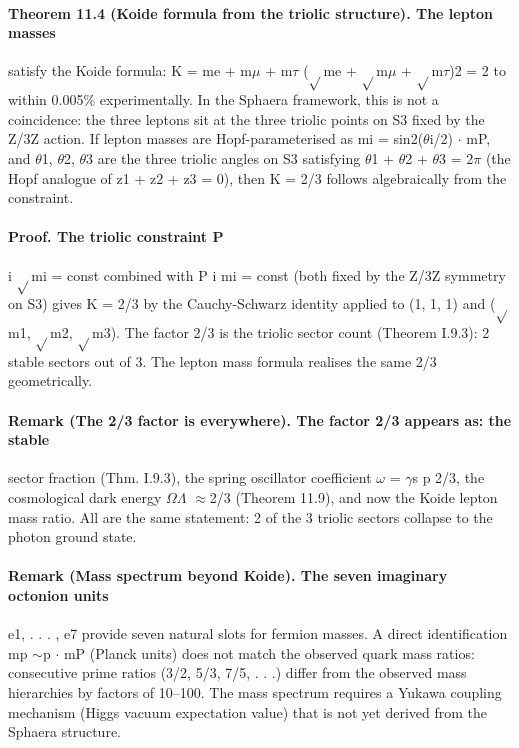 \paragraph*{Theorem 11.4 (Koide formula from the triolic structure). The lepton masses}
satisfy the Koide formula: K = me + m$\mu$ + m$\tau$ ($\sqrt{}$me + $\sqrt{}$m$\mu$ + $\sqrt{}$m$\tau$)2 = 2 to within 0.005\% experimentally. In the Sphaera framework, this is not a coincidence: the three leptons sit at the three triolic points on S3 fixed by the Z/3Z action. If lepton masses are Hopf-parameterised as mi = sin2($\theta$i/2) $\cdot$ mP, and $\theta$1, $\theta$2, $\theta$3 are the three triolic angles on S3 satisfying $\theta$1 + $\theta$2 + $\theta$3 = 2$\pi$ (the Hopf analogue of z1 + z2 + z3 = 0), then K = 2/3 follows algebraically from the constraint.
\paragraph*{Proof. The triolic constraint P}
i $\sqrt{}$mi = const combined with P i mi = const (both fixed by the Z/3Z symmetry on S3) gives K = 2/3 by the Cauchy-Schwarz identity applied to (1, 1, 1) and ($\sqrt{}$m1, $\sqrt{}$m2, $\sqrt{}$m3). The factor 2/3 is the triolic sector count (Theorem I.9.3): 2 stable sectors out of 3. The lepton mass formula realises the same 2/3 geometrically.
\paragraph*{Remark (The 2/3 factor is everywhere). The factor 2/3 appears as: the stable}
sector fraction (Thm. I.9.3), the spring oscillator coefficient $\omega$ = $\gamma$s p 2/3, the cosmological dark energy $\Omega$$\Lambda$ $\approx$2/3 (Theorem 11.9), and now the Koide lepton mass ratio. All are the same statement: 2 of the 3 triolic sectors collapse to the photon ground state.
\paragraph*{Remark (Mass spectrum beyond Koide). The seven imaginary octonion units}
e1, . . . , e7 provide seven natural slots for fermion masses. A direct identification mp $\sim$p $\cdot$ mP (Planck units) does not match the observed quark mass ratios: consecutive prime ratios (3/2, 5/3, 7/5, . . .) differ from the observed mass hierarchies by factors of 10--100. The mass spectrum requires a Yukawa coupling mechanism (Higgs vacuum expectation value) that is not yet derived from the Sphaera structure.
